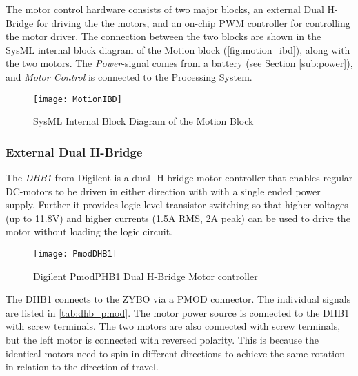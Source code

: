 \documentclass[Main]{subfiles}
\begin{document}
		The motor control hardware consists of two major blocks, an external Dual H-Bridge for driving the the motors, and an on-chip PWM controller for controlling the motor driver.
		The connection between the two blocks are shown in the SysML internal block diagram of the Motion block (\autoref{fig:motion_ibd}), along with the two motors.
		The \emph{Power}-signal comes from a battery (see Section \ref{sub:power}), and \emph{Motor Control} is connected to the Processing System.

		\begin{figure}[H]
			\centering
			\texttt{[image: MotionIBD]}
			\caption{SysML Internal Block Diagram of the Motion Block}
			\label{fig:motion_ibd}
		\end{figure}

		\subsubsection{External Dual H-Bridge} %
		\label{ssub:external_dual_h_bridge}
			
			The \emph{DHB1} from Digilent is a dual- H-bridge motor controller that enables regular DC-motors to be driven in either direction with with a single ended power supply.
			Further it provides logic level transistor switching so that higher voltages (up to 11.8V) and higher currents (1.5A RMS, 2A peak) can be used to drive the motor without loading the logic circuit.

			\begin{figure}[H]
				\centering
				\texttt{[image: PmodDHB1]}
				\caption{Digilent PmodPHB1 Dual H-Bridge Motor controller \cite{Digilent2013}}
				\label{fig:DHB1}
			\end{figure}

			The DHB1 connects to the ZYBO via a PMOD connector. The individual signals are listed in \autoref{tab:dhb_pmod}.
			The motor power source is connected to the DHB1 with screw terminals. The two motors are also connected with screw terminals, but the left motor is connected with reversed polarity.
			This is because the identical motors need to spin in different directions to achieve the same rotation in relation to the direction of travel.
\end{document}

